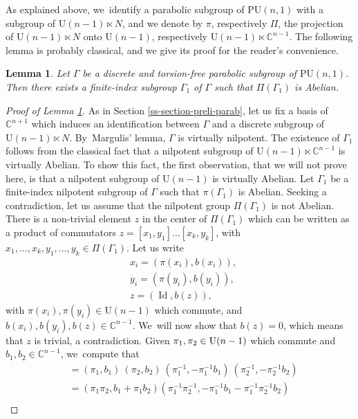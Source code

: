 \documentclass[JEP,XML,SOM,Unicode,NoEqCountersInSection,published]{cedram}
\newtheorem{lemma}[theorem]{Lemma}
\theoremstyle{definition}
\newcommand{\C}{\mathbb{C}}
\newcommand{\PU}{\mathrm{PU}}
\DeclareMathOperator{\Id}{Id}
\def\C{\mathbb{C}}
\newcommand{\PU}{\mathrm{PU}}
\begin{document}
As explained above, we~identify a parabolic subgroup of $\PU(n,1)$ with a subgroup of $\mathrm{U}(n-1)\ltimes N$, and we denote by $\pi$, respectively $\Pi $, the projection of $\mathrm{U}(n-1)\ltimes N$ onto $\mathrm{U}(n-1)$, respectively $ \mathrm{U}(n-1)\ltimes \C^{n-1}$. The following lemma is probably classical, and we give its proof for the reader's convenience.

\begin{lemma}\label{lem-ssgrp-pi-abelien}
Let $\Gamma$ be a discrete and torsion-free parabolic subgroup of $\PU(n,1)$. Then there exists a finite-index subgroup $\Gamma_1$ of $\Gamma$ such that $\Pi(\Gamma_1)$ is Abelian.
\end{lemma}

\begin{proof}[Proof of Lemma \ref{lem-ssgrp-pi-abelien}]
As in Section \ref{ss-section-preli-parab}, let us fix a basis of $\C^{n+1}$ which induces an identification between $\Gamma$ and a discrete subgroup of $\mathrm{U}(n-1)\ltimes N$. By~Margulis' lemma, $\Gamma$ is virtually nilpotent. The existence of $\Gamma_1$ follows from the classical fact that a nilpotent subgroup of $\mathrm{U}(n-1)\ltimes \C^{n-1}$ is virtually Abelian. To show this fact, the first observation, that we will not prove here, is that a nilpotent subgroup of $\mathrm{U}(n-1)$ is virtually Abelian. Let $\Gamma_1$ be a finite-index nilpotent subgroup of $\Gamma$ such that $\pi(\Gamma_1)$ is Abelian. Seeking a contradiction, let us assume that the nilpotent group $\Pi(\Gamma_1)$ is not Abelian. There is a non-trivial element $z$ in the center of $\Pi(\Gamma_1)$ which can be written as a product of commutators $z=[x_1,y_1]\dots[x_k,y_k]$, with $x_1,\dots,x_k,y_1,\dots,y_k\in \Pi(\Gamma_1)$. Let us write
\begin{align*}
&x_i=(\pi(x_i),b(x_i)),\\
&y_i=(\pi(y_i),b(y_i)),\\
&z= (\Id,b(z)),
\end{align*}
with $\pi(x_i),\pi(y_i)\in \mathrm{U}(n-1)$ which commute, and $b(x_i),b(y_i),b(z)\in \C^{n-1}$. We~will now show that $b(z)=0$, which means that $z$ is trivial, a contradiction.
Given $\pi_1,\pi_2\in\nobreak \mathrm{U}(n-\nobreak1)$ which commute and $b_1,b_2\in \C^{n-1}$, we~compute that
\begin{align*}
[(\pi_1,b_1),(\pi_2,b_2)]&=(\pi_1,b_1)\ (\pi_2,b_2)\ (\pi_1^{-1},-\pi_1^{-1}b_1)\ (\pi_2^{-1},-\pi_2^{-1}b_2) \\
&= (\pi_1\pi_2,b_1+\pi_1b_2)(\pi_1^{-1}\pi_2^{-1},-\pi_1^{-1}b_1 - \pi_1^{-1}\pi_2^{-1}b_2)\\

\end{align*}
\end{proof}
\end{document}
